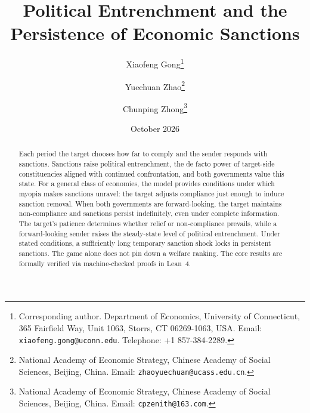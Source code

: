 \documentclass[11pt]{article}
\title{Political Entrenchment and the Persistence of Economic Sanctions}
\author{Xiaofeng Gong\thanks{Corresponding author. Department of
Economics, University of Connecticut, 365 Fairfield Way, Unit 1063,
Storrs, CT 06269-1063, USA. Email:
\texttt{xiaofeng.gong@uconn.edu}. Telephone: +1 857-384-2289.}
\and Yuechuan Zhao\thanks{National Academy of Economic Strategy, Chinese Academy of
Social Sciences, Beijing, China. Email: \texttt{zhaoyuechuan@ucass.edu.cn}.}
\and Chunping Zhong\thanks{National Academy of Economic Strategy, Chinese Academy of
Social Sciences, Beijing, China. Email: \texttt{cpzenith@163.com}.}}
\date{October 2026}
\begin{document}
\maketitle

\begin{abstract}
 Each period the target chooses how far
to comply and the sender responds with sanctions. Sanctions raise political
entrenchment, the de facto power of target-side constituencies aligned with continued
confrontation, and both governments value this state. For a general class of economies, the
model provides conditions under which myopia makes sanctions unravel: the target
adjusts compliance just enough to induce sanction removal. When both governments are
forward-looking, the target maintains non-compliance and sanctions persist
indefinitely, even under complete information. The target's patience determines
whether relief or non-compliance prevails, while a forward-looking sender raises the
steady-state level of political entrenchment. Under stated conditions, a sufficiently
long temporary sanction shock locks in persistent sanctions. The game alone does not
pin down a welfare ranking. The core results are formally verified via machine-checked
proofs in Lean~4.
\end{abstract}
\end{document}
